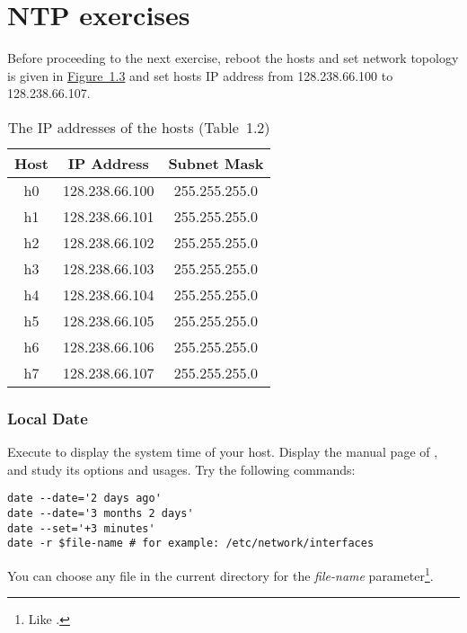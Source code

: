 \documentclass{../UTNetLab}
\begin{document}
\part{NTP exercises}
Before proceeding to the next exercise, reboot the hosts and set network topology is given in \hyperref[fig:1.3]{Figure~1.3} and set hosts IP address from 128.238.66.100 to 128.238.66.107.
\begin{center}
    \begin{minipage}{0.48\textwidth}
        \begin{flushleft}
            \begin{table}[H]
                \caption{The IP addresses of the hosts (Table~1.2)}
                \centering
                \begin{tabular}{ c c c }
                    \hline \hline
                    Host & IP Address     & Subnet Mask   \\
                    \hline
                    h0   & 128.238.66.100 & 255.255.255.0 \\
                    h1   & 128.238.66.101 & 255.255.255.0 \\
                    h2   & 128.238.66.102 & 255.255.255.0 \\
                    h3   & 128.238.66.103 & 255.255.255.0 \\
                    h4   & 128.238.66.104 & 255.255.255.0 \\
                    h5   & 128.238.66.105 & 255.255.255.0 \\
                    h6   & 128.238.66.106 & 255.255.255.0 \\
                    h7   & 128.238.66.107 & 255.255.255.0 \\
                    \hline \hline
                \end{tabular}
            \end{table}
        \end{flushleft}
    \end{minipage}
\end{center}

\section{Local Date}
Execute  to display the system time of your host.
Display the manual page of , and study its options and usages.
Try the following  commands:

\begin{lstlisting}[emph={$file-name}]
date --date='2 days ago'
date --date='3 months 2 days'
date --set='+3 minutes'
date -r $file-name # for example: /etc/network/interfaces
    \end{lstlisting}
You can choose any file in the current directory for the \textit{file-name} parameter\footnote{Like .}.
\end{document}
